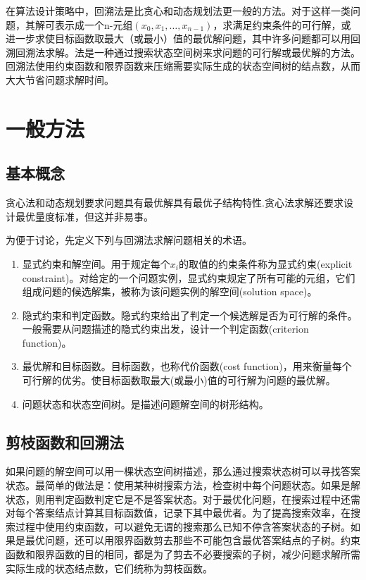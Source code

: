 在算法设计策略中，回溯法是比贪心和动态规划法更一般的方法。对于这样一类问题，其解可表示成一个n-元组$(x_0,x_1,\dots, x_{n-1})$，求满足约束条件的可行解，或进一步求使目标函数取最大（或最小）值的最优解问题，其中许多问题都可以用回溯回溯法求解。法是一种通过搜索状态空间树来求问题的可行解或最优解的方法。回溯法使用约束函数和限界函数来压缩需要实际生成的状态空间树的结点数，从而大大节省问题求解时间。

\section{一般方法}
\subsection*{基本概念}
贪心法和动态规划要求问题具有最优解具有最优子结构特性.贪心法求解还要求设计最优量度标准，但这并非易事。

为便于讨论，先定义下列与回溯法求解问题相关的术语。
\begin{enumerate}
	\item 显式约束和解空间。用于规定每个$x_i$的取值的约束条件称为显式约束(explicit constraint)。对给定的一个问题实例，显式约束规定了所有可能的元组，它们组成问题的候选解集，被称为该问题实例的解空间(solution space)。
	\item 隐式约束和判定函数。隐式约束给出了判定一个候选解是否为可行解的条件。一般需要从问题描述的隐式约束出发，设计一个判定函数(criterion function)。
	\item 最优解和目标函数。目标函数，也称代价函数(cost function)，用来衡量每个可行解的优劣。使目标函数取最大(或最小)值的可行解为问题的最优解。
	\item 问题状态和状态空间树。是描述问题解空间的树形结构。
\end{enumerate}
\subsection*{剪枝函数和回溯法}
如果问题的解空间可以用一棵状态空间树描述，那么通过搜索状态树可以寻找答案状态。最简单的做法是：使用某种树搜索方法，检查树中每个问题状态。如果是解状态，则用判定函数判定它是不是答案状态。对于最优化问题，在搜索过程中还需对每个答案结点计算其目标函数值，记录下其中最优者。为了提高搜索效率，在搜索过程中使用约束函数，可以避免无谓的搜索那么已知不停含答案状态的子树。如果是最优问题，还可以用限界函数剪去那些不可能包含最优答案结点的子树。约束函数和限界函数的目的相同，都是为了剪去不必要搜索的子树，减少问题求解所需实际生成的状态结点数，它们统称为剪枝函数。


